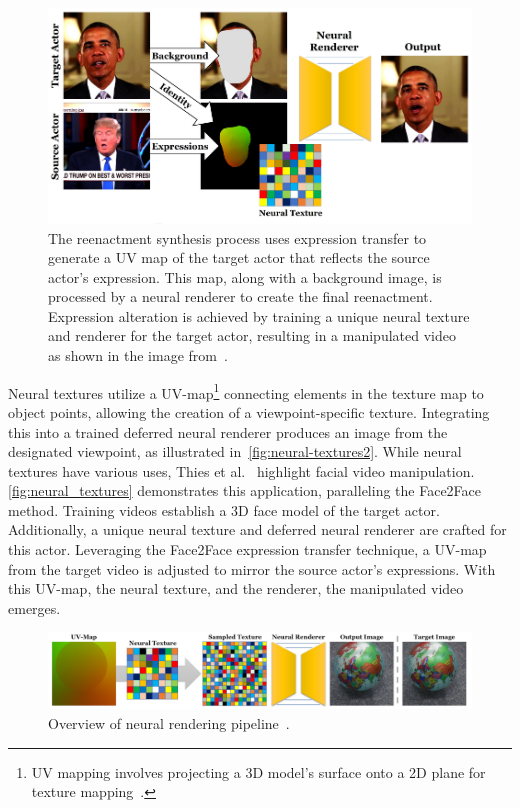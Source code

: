\begin{figure}[htpb]
	\centering
	\includegraphics[scale=0.55]{figures/neural_textures}
	\caption{The reenactment synthesis process uses expression transfer
		to generate a UV map of the target actor that reflects the source
		actor's expression. This map, along with a background image, is
		processed by a neural renderer to create the final reenactment.
		Expression alteration is achieved by training a unique neural
		texture and renderer for the target actor, resulting in a
		manipulated video as shown in the image from~\cite{thies2019deferred}.}\label{fig:neural_textures}
\end{figure}

Neural textures utilize a UV-map\footnote{UV mapping involves projecting a 3D model's surface
	onto a 2D plane for  texture mapping~\cite{enwiki:1169139226}.}
connecting elements in the texture map to object points, allowing the creation of a
viewpoint-specific texture. Integrating this into a trained deferred neural renderer
produces an image from the designated viewpoint, as illustrated in~\autoref{fig:neural-textures2}.
While neural textures have various uses, Thies et al.~\cite{thies2019deferred} highlight
facial video manipulation. \autoref{fig:neural_textures} demonstrates this application,
paralleling the Face2Face~\cite{thies2020face2face} method. Training videos establish a
3D face model of the target actor. Additionally, a unique neural texture and deferred neural
renderer are crafted for this actor. Leveraging the Face2Face expression transfer
technique, a UV-map from the target video is adjusted to mirror the source actor's
expressions. With this UV-map, the neural texture, and the renderer, the manipulated video emerges.

\begin{figure}[htpb]
	\centering
	\includegraphics[scale=0.25]{figures/neural_textures2}
	\caption{Overview of neural rendering pipeline~\cite{thies2019deferred}.}\label{fig:neural-textures2}
\end{figure}

